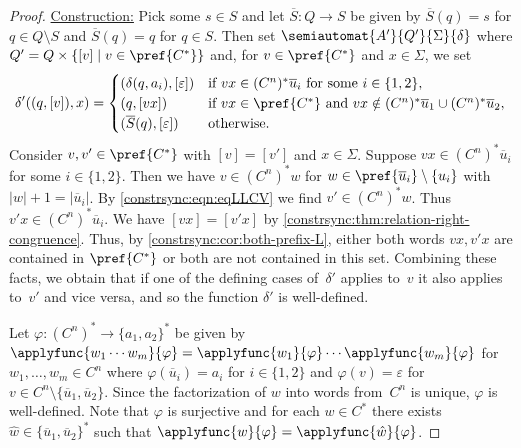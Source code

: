 \begin{proof}
	
	\medskip
	\noindent\underline{Construction:} Pick some $s \in S$ and let $\overline{S} \colon Q \to S$
	be given by $\overline{S}(q) = s$ for $q \in Q \setminus S$
	and $\overline{S}(q) = q$ for $q \in S$.	
	Then set $\semiautomat{A'}{Q'}{\Sigma}{\delta}$
	where $Q' = Q \times \{ [v] \mid v \in \pref{C^*} \}$ and, 
	for $v \in \pref{C^*}$ and $x \in \Sigma$, we set
	\[
	\delta'((q, [v]), x)
	=
	\begin{cases}
		(\delta(q, a_i), [\varepsilon]) & \text{if } vx \in (C^n)^* \overline{u}_i \text{ for some } i \in \{1,2\}, \\
		(q, [vx]) & \text{if } vx \in \pref{C^*} \text{ and } vx \notin (C^n)^*\overline{u}_1 \cup (C^n)^*\overline{u}_2, \\
		(\overline{S}(q), [\varepsilon]) & \text{otherwise.}		
	\end{cases}
	\]
	Consider $v, v' \in \pref{C^*}$
	with $[v] = [v']$ and $x \in \Sigma$.
	Suppose $vx \in (C^n)^* \overline{u}_i$ for some $i \in \{1,2\}$.
	Then we have $v \in (C^n)^* w$
	for $w \in \pref{\overline{u}_i}\setminus \{u_i\}$
	with $|w| + 1 = |\overline{u}_i|$.
	By \cref{constrsync:eqn:eqLLCV} 
	we find $v' \in (C^n)^*w$.
	Thus $v'x \in (C^n)^* \overline{u}_i$.
	We have $[vx] = [v'x]$ by \cref{constrsync:thm:relation-right-congruence}.
	Thus, by \cref{constrsync:cor:both-prefix-L}, either
	both words $vx, v'x$ are contained in $\pref{C^*}$
	or both are not contained in this set.
	Combining these facts,	
	we obtain that if one of the defining cases of~$\delta'$
	applies to~$v$ it also applies to~$v'$ and vice versa,
	and so the function $\delta'$ is well-defined.
	
	
	Let $\varphi \colon (C^n)^* \to \{a_1, a_2\}^*$ be given
	by $\applyfunc{w_1 \cdots w_m}{\varphi} = \applyfunc{w_1}{\varphi} \cdots \applyfunc{w_m}{\varphi}$ 
	for $w_1, \ldots, w_m \in C^n$
	where $\varphi(\overline{u}_i) = a_i$ for $i \in \{1,2\}$
	and $\varphi(v) = \varepsilon$ for $v \in C^n \setminus \{\overline{u}_1, \overline{u}_2\}$.
	Since the factorization of $w$ into words from~$C^n$ is unique, $\varphi$
	is well-defined. Note that $\varphi$ is surjective and for each $w \in C^*$
	there exists $\hat{w} \in \{\overline{u}_1, \overline{u}_2\}^*$
	such that $\applyfunc{w}{\varphi} = \applyfunc{\hat{w}}{\varphi}$.
				

\end{proof}
